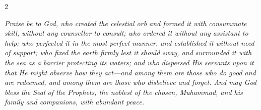 \documentclass[11pt,a4paper]{article}
\begin{document}
\begin{paracol}{2}

\switchcolumn[0]
\begin{flushright}
{\small\arabicfont
{}}
\end{flushright}

\switchcolumn[1]
\begin{flushleft}
\small
\textit{Praise be to God, who created the celestial orb and formed it with consummate skill, without any counsellor to consult; who ordered it without any assistant to help; who perfected it in the most perfect manner, and established it without need of support; who fixed the earth firmly lest it should sway, and surrounded it with the sea as a barrier protecting its waters; and who dispersed His servants upon it that He might observe how they act---and among them are those who do good and are redeemed, and among them are those who disbelieve and forget. And may God bless the Seal of the Prophets, the noblest of the chosen, Muhammad, and his family and companions, with abundant peace.}
\end{flushleft}

\end{paracol}

\vspace{0.5cm}
\end{document}
